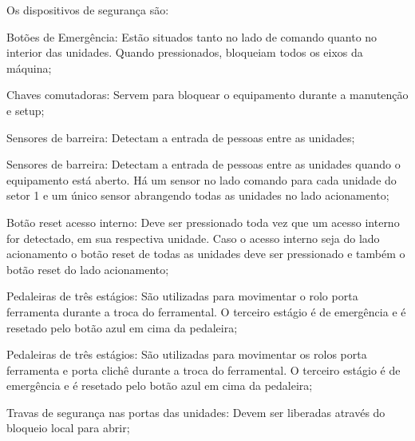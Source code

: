 Os dispositivos de segurança são:
\vspace*{10pt}



\begin{safetyDevices}

  \item[\ding{\dingNumber}] Botões de Emergência: Estão situados \ifmachineTypeIcv tanto \fi no lado de comando \ifmachineTypeIcv quanto no interior das unidades\fi. Quando pressionados, bloqueiam todos os eixos da máquina;
  \item[\ding{\dingNumber}] Chaves comutadoras: Servem para bloquear o equipamento durante a manutenção e setup;
  \ifmachineTypeFlexo
  \item[\ding{\dingNumber}] Sensores de barreira: Detectam a entrada de pessoas entre as unidades;
  \fi
  \ifmachineTypeIcv
  \item[\ding{\dingNumber}] Sensores de barreira: Detectam a entrada de pessoas entre as unidades quando o equipamento está aberto. Há um sensor no lado comando para cada 
  unidade do setor 1 e um único sensor abrangendo todas as unidades no lado acionamento;
  \fi
  \item[\ding{\dingNumber}] Botão reset acesso interno: Deve ser pressionado toda vez que um acesso interno for detectado, em sua respectiva unidade. Caso o acesso 
  interno seja do lado acionamento o botão reset de todas as unidades deve ser pressionado e também o botão reset do lado acionamento;
  \ifmachineTypeFlexo
  \item[\ding{\dingNumber}] Pedaleiras de três estágios: São utilizadas para movimentar o rolo porta ferramenta durante a troca do ferramental. O terceiro estágio é de
  emergência e é resetado pelo botão azul em cima da pedaleira;
  \fi
  \ifmachineTypeIcv
  \item[\ding{\dingNumber}] Pedaleiras de três estágios: São utilizadas para movimentar os rolos porta ferramenta e porta clichê durante a troca do ferramental.
  O terceiro estágio é de emergência e é resetado pelo botão azul em cima da pedaleira;
  \fi
  \ifmachineTypeFlexo
  \item[\ding{\dingNumber}] Travas de segurança nas portas das unidades: Devem ser liberadas através do bloqueio local para abrir;

\end{safetyDevices}
